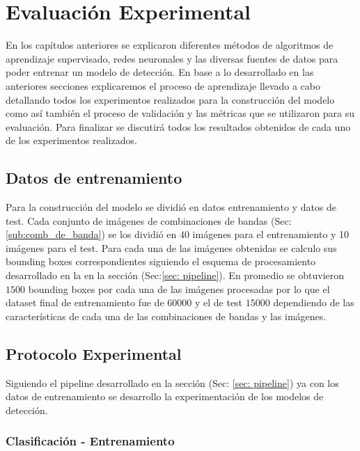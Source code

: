 \chapter{Evaluación Experimental}\label{chap:evaluacion}

En los capítulos anteriores se explicaron diferentes métodos de algoritmos de aprendizaje supervisado, redes neuronales y las diversas fuentes de datos para poder entrenar un modelo de detección. En  base a lo desarrollado en las anteriores secciones  explicaremos el proceso de aprendizaje llevado a cabo detallando todos los  experimentos realizados para la construcción del modelo como así también  el proceso de validación y las métricas que se utilizaron para su evaluación. Para finalizar se discutirá todos los resultados obtenidos de cada uno de los  experimentos realizados. 

\section{Datos de entrenamiento}\label{sec:datos_entrenamiento}

Para la construcción del modelo se dividió en  datos entrenamiento y datos de test. Cada conjunto de imágenes de combinaciones de bandas (Sec:\ref{sub:comb_de_banda}) se los dividió en 40 imágenes para el entrenamiento y 10 imágenes para el test. Para cada una de las imágenes obtenidas se calculo sus bounding boxes correspondientes  siguiendo el esquema de procesamiento desarrollado en la  en la sección (Sec:\ref{sec: pipeline}). En promedio se obtuvieron $1500$ bounding boxes por cada una de las imágenes procesadas por lo que el dataset final de entrenamiento fue de $60000$ y el de test $15000$  dependiendo de las características de cada una de las combinaciones de bandas y las imágenes. 



\section{Protocolo Experimental}\label{sec:entrenamiento}

Siguiendo el pipeline desarrollado en la sección (Sec: \ref{sec: pipeline}) ya con los datos de entrenamiento se desarrollo la experimentación de los modelos de detección.

\subsection*{Clasificación - Entrenamiento}\label{sub:entr_class}

